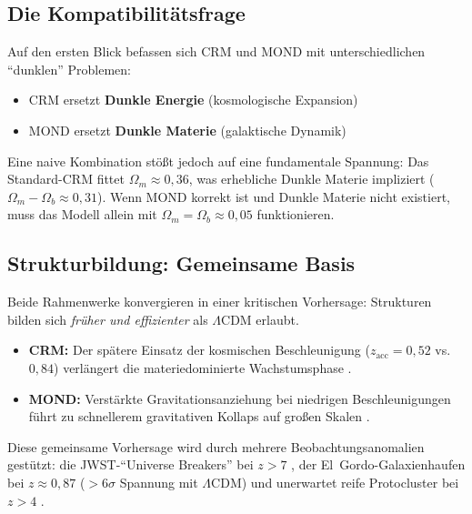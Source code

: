 \documentclass[aps,prd,twocolumn,superscriptaddress,nofootinbib]{revtex4-2}
\begin{document}
\subsection{Die Kompatibilit\"atsfrage}

Auf den ersten Blick befassen sich CRM und MOND mit unterschiedlichen "`dunklen"' Problemen:
\begin{itemize}
\item CRM ersetzt \textbf{Dunkle Energie} (kosmologische Expansion)
\item MOND ersetzt \textbf{Dunkle Materie} (galaktische Dynamik)
\end{itemize}

Eine naive Kombination st\"o\ss{}t jedoch auf eine fundamentale Spannung: Das Standard-CRM fittet $\Omega_m \approx 0{,}36$, was erhebliche Dunkle Materie impliziert ($\Omega_m - \Omega_b \approx 0{,}31$). Wenn MOND korrekt ist und Dunkle Materie nicht existiert, muss das Modell allein mit $\Omega_m = \Omega_b \approx 0{,}05$ funktionieren.

\subsection{Strukturbildung: Gemeinsame Basis}

Beide Rahmenwerke konvergieren in einer kritischen Vorhersage: Strukturen bilden sich \textit{fr\"uher und effizienter} als $\Lambda$CDM erlaubt.

\begin{itemize}
\item \textbf{CRM:} Der sp\"atere Einsatz der kosmischen Beschleunigung ($z_{\mathrm{acc}} = 0{,}52$ vs.\ $0{,}84$) verl\"angert die materiedominierte Wachstumsphase \cite{Geiger2026}.
\item \textbf{MOND:} Verst\"arkte Gravitationsanziehung bei niedrigen Beschleunigungen f\"uhrt zu schnellerem gravitativen Kollaps auf gro\ss{}en Skalen \cite{Asencio2023}.
\end{itemize}

Diese gemeinsame Vorhersage wird durch mehrere Beobachtungsanomalien gest\"utzt: die JWST-"`Universe Breakers"' bei $z > 7$ \cite{Labbe2023, BoylanKolchin2023}, der El~Gordo-Galaxienhaufen bei $z \approx 0{,}87$ (${>}6\sigma$ Spannung mit $\Lambda$CDM) \cite{Asencio2023} und unerwartet reife Protocluster bei $z > 4$ \cite{Miller2018}.

\end{document}
